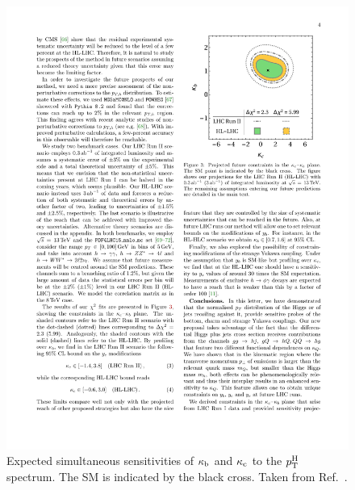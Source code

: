 \begin{figure}[hbtp]
  \begin{center}
    \includegraphics[width=0.6\linewidth]{img/projections/kbkc_theoryprojection_hllhc.pdf}
    \caption{
        Expected simultaneous sensitivities of $\kappa_{\mathrm{b}}$ and $\kappa_{\mathrm{c}}$ to the $p_\mathrm{T}^\mathrm{H}$ spectrum.
        The SM is indicated by the black cross.
        Taken from Ref.~\cite{Bishara:2016jga}.
        }
    \label{fig:kbkc_constraints_hllhc}
  \end{center}
\end{figure}


